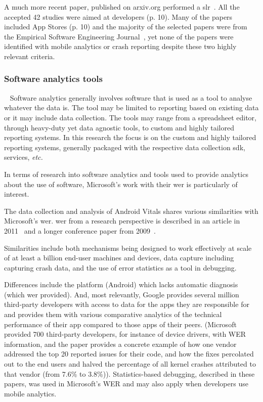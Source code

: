 A much more recent paper, published on arxiv.org performed a \Gls{slr}~. All the accepted 42 studies were aimed at developers (p. 10). Many of the papers included App Stores (p. 10) and the majority of the selected papers were from the Empirical Software Engineering Journal~, yet none of the papers were identified with mobile analytics or crash reporting despite these two highly relevant criteria. 


\subsubsection{Software analytics tools}~\label{rw-software-analytics-tools-research}
Software analytics generally involves software that is used as a tool to analyse whatever the data is. The tool may be limited to reporting based on existing data or it may include data collection. The tools may range from a spreadsheet editor, through heavy-duty yet data agnostic tools, to custom and highly tailored reporting systems. In this research the focus is on the custom and highly tailored reporting systems, generally packaged with the respective data collection \Gls{sdk}, services, \emph{etc.}  

In terms of research into software analytics and tools used to provide analytics about the use of software, Microsoft's work with their \Gls{wer} is particularly of interest. 

The data collection and analysis of Android Vitals shares various similarities with Microsoft's \acrfull{wer}. \Gls{wer} from a research perspective is described in an article in 2011~ and a longer conference paper from 2009~. 

Similarities include both mechanisms being designed to work effectively at scale of at least a billion end-user machines and devices, data capture including capturing crash data, and the use of error statistics as a tool in debugging.

Differences include the platform (Android) which lacks automatic diagnosis (which \Gls{wer} provided). And, most relevantly, Google provides several million third-party developers with access to data for the apps they are responsible for and provides them with various comparative analytics of the technical performance of their app compared to those apps of their peers. (Microsoft provided 700 third-party developers, for instance of device drivers, with WER information, and the paper provides a concrete example of how one vendor addressed the top 20 reported issues for their code, and how the fixes percolated out to the end users and halved the percentage of all kernel crashes attributed to that vendor (from 7.6\% to 3.8\%)). Statistics-based debugging, described in these papers, was used in Microsoft's WER and may also apply when developers use mobile analytics.

